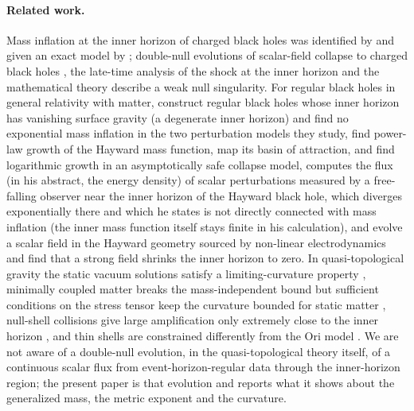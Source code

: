 \documentclass[11pt]{article}
\begin{document}
\paragraph{Related work.} Mass inflation at the inner horizon of charged black holes was identified by \citet{PoissonIsrael1989,PoissonIsrael1990} and given an exact model by \citet{Ori1991}; double-null evolutions of scalar-field collapse to charged black holes \citep{BradySmith1995,Burko1997,HodPiran1998}, the late-time analysis of the shock at the inner horizon \citep{MarolfOri2012} and the mathematical theory \citep{Dafermos2005} describe a weak null singularity. For regular black holes in general relativity with matter, \citet{CarballoRubio2022a} construct regular black holes whose inner horizon has vanishing surface gravity (a degenerate inner horizon) and find no exponential mass inflation in the two perturbation models they study, \citet{BonannoPanassitiSaueressig2025} find power-law growth of the Hayward mass function, map its basin of attraction, and find logarithmic growth in an asymptotically safe collapse model, \citet{Iofa2022} computes the flux (in his abstract, the energy density) of scalar perturbations measured by a free-falling observer near the inner horizon of the Hayward black hole, which diverges exponentially there and which he states is not directly connected with mass inflation (the inner mass function itself stays finite in his calculation), and \citet{ShaoGuoTianZhang2025} evolve a scalar field in the Hayward geometry sourced by non-linear electrodynamics and find that a strong field shrinks the inner horizon to zero. In quasi-topological gravity the static vacuum solutions satisfy a limiting-curvature property \citep{BuenoHennigarMurciaVicenteCano2026}, minimally coupled matter breaks the mass-independent bound but sufficient conditions on the stress tensor keep the curvature bounded for static matter \citep{BuenoHennigarMurciaVicenteCano2026}, null-shell collisions give large amplification only extremely close to the inner horizon \citep{FrolovZelnikov2026}, and thin shells are constrained differently from the Ori model \citep{DiFilippo2026}. We are not aware of a double-null evolution, in the quasi-topological theory itself, of a continuous scalar flux from event-horizon-regular data through the inner-horizon region; the present paper is that evolution and reports what it shows about the generalized mass, the metric exponent and the curvature.
\end{document}
